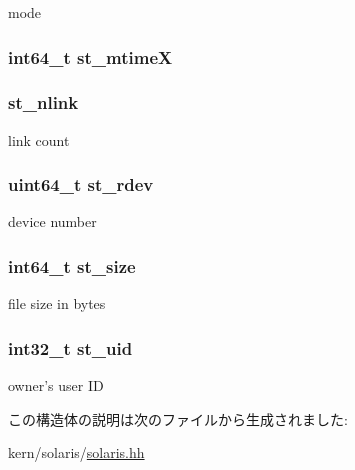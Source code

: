 mode \hypertarget{structSolaris_1_1tgt__stat64_a85f7ee07d7d01bcbae6a22cc45f01846}{
\subsubsection[{st\_\-mtimeX}]{\setlength{\rightskip}{0pt plus 5cm}int64\_\-t {\bf st\_\-mtimeX}}}
\label{structSolaris_1_1tgt__stat64_a85f7ee07d7d01bcbae6a22cc45f01846}
\hypertarget{structSolaris_1_1tgt__stat64_ab77c257c135fa586e930ef0bf0977c08}{
\subsubsection[{st\_\-nlink}]{ {\bf st\_\-nlink}}}
\label{structSolaris_1_1tgt__stat64_ab77c257c135fa586e930ef0bf0977c08}


link count \hypertarget{structSolaris_1_1tgt__stat64_ac430407fd3b0e421da1ee8f66c95a786}{
\subsubsection[{st\_\-rdev}]{\setlength{\rightskip}{0pt plus 5cm}uint64\_\-t {\bf st\_\-rdev}}}
\label{structSolaris_1_1tgt__stat64_ac430407fd3b0e421da1ee8f66c95a786}


device number \hypertarget{structSolaris_1_1tgt__stat64_aec608d79c93ed6d010aec9f7487e0064}{
\subsubsection[{st\_\-size}]{\setlength{\rightskip}{0pt plus 5cm}int64\_\-t {\bf st\_\-size}}}
\label{structSolaris_1_1tgt__stat64_aec608d79c93ed6d010aec9f7487e0064}


file size in bytes \hypertarget{structSolaris_1_1tgt__stat64_a3bb3835f9991cdc69a5cea7ca39fbaaa}{
\subsubsection[{st\_\-uid}]{\setlength{\rightskip}{0pt plus 5cm}int32\_\-t {\bf st\_\-uid}}}
\label{structSolaris_1_1tgt__stat64_a3bb3835f9991cdc69a5cea7ca39fbaaa}


owner's user ID 

この構造体の説明は次のファイルから生成されました:\begin{DoxyCompactItemize}
\item 
kern/solaris/\hyperlink{kern_2solaris_2solaris_8hh}{solaris.hh}\end{DoxyCompactItemize}
